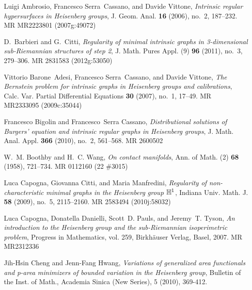 \documentclass[10pt]{amsart}
\theoremstyle{definition}
\theoremstyle{remark}
\numberwithin{equation}{section}
\begin{document}
\providecommand{\bysame}{\leavevmode\hbox to3em{\hrulefill}\thinspace}
\providecommand{\MR}{\relax\ifhmode\unskip\space\fi MR }
\providecommand{\MRhref}[2]{  \href{http://www.ams.org/mathscinet-getitem?mr=#1}{#2}
}
\providecommand{\href}[2]{#2}
\begin{thebibliography}{10}

Luigi Ambrosio, Francesco Serra~Cassano, and Davide Vittone, \emph{Intrinsic
  regular hypersurfaces in {H}eisenberg groups}, J. Geom. Anal. \textbf{16}
  (2006), no.~2, 187--232. \MR{MR2223801 (2007g:49072)}

D.~Barbieri and G.~Citti, \emph{Regularity of minimal intrinsic graphs in
  3-dimensional sub-{R}iemannian structures of step 2}, J. Math. Pures Appl.
  (9) \textbf{96} (2011), no.~3, 279--306. \MR{2831583 (2012g:53050)}

Vittorio Barone~Adesi, Francesco Serra~Cassano, and Davide Vittone, \emph{The
  {B}ernstein problem for intrinsic graphs in {H}eisenberg groups and
  calibrations}, Calc. Var. Partial Differential Equations \textbf{30} (2007),
  no.~1, 17--49. \MR{MR2333095 (2009c:35044)}

Francesco Bigolin and Francesco~Serra Cassano, \emph{Distributional solutions
  of {B}urgers' equation and intrinsic regular graphs in {H}eisenberg groups},
  J. Math. Anal. Appl. \textbf{366} (2010), no.~2, 561--568. \MR{2600502}

W.~M. Boothby and H.~C. Wang, \emph{On contact manifolds}, Ann. of Math. (2)
  \textbf{68} (1958), 721--734. \MR{0112160 (22 \#3015)}

Luca Capogna, Giovanna Citti, and Maria Manfredini, \emph{Regularity of
  non-characteristic minimal graphs in the {H}eisenberg group {$\Bbb H^1$}},
  Indiana Univ. Math. J. \textbf{58} (2009), no.~5, 2115--2160. \MR{2583494
  (2010j:58032)}

Luca Capogna, Donatella Danielli, Scott~D. Pauls, and Jeremy~T. Tyson, \emph{An
  introduction to the {H}eisenberg group and the sub-{R}iemannian isoperimetric
  problem}, Progress in Mathematics, vol. 259, Birkh\"auser Verlag, Basel,
  2007. \MR{MR2312336}

Jih-Hsin Cheng and Jenn-Fang Hwang, \emph{Variations of generalized area
  functionals and p-area minimizers of bounded variation in the {H}eisenberg
  group}, Bulletin of the Inst. of Math., Academia Sinica (New Series), 5
  (2010), 369-412.


\end{thebibliography}
\end{document}
